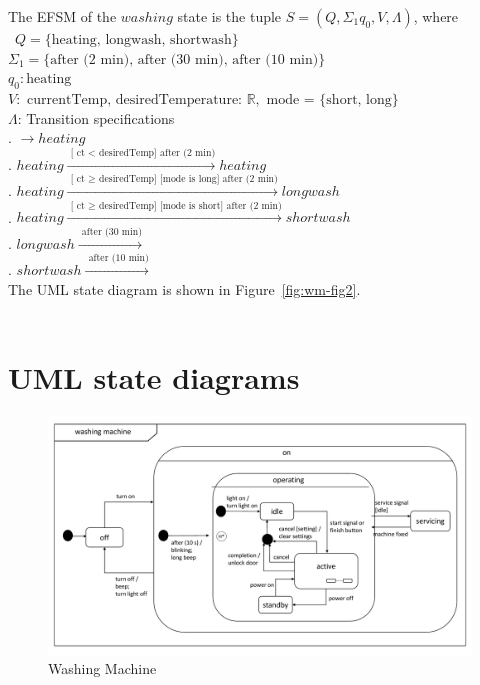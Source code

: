 \documentclass[12pt]{article}
\begin{document}
\begin{spacing}{1.5}
\noindent The EFSM of the $washing$ state is the tuple $S = (Q, \Sigma_1 q_0, V, \Lambda)$, where\\\
\noindent $Q = \{\text {heating, longwash, shortwash}\}$\\
\noindent $\Sigma_1 = \{\text {after (2 min), after (30 min), after (10 min)}\}$\\ 
\noindent $q_0: \text{heating}$\\
\noindent $V: \text{ currentTemp, desiredTemperature: } \mathbb{R}, \text{ mode = \{short, long\}}$\\
\noindent $\Lambda$: Transition specifications\\
. $\xrightarrow {} heating$\\
. $heating \xrightarrow {\text { [ ct $<$ desiredTemp] after (2 min)}} heating $\\
\indent 3. $heating \xrightarrow {\text { [ ct $\geq$ desiredTemp] [mode is long] after (2 min)}}  longwash$\\
\indent 4. $heating \xrightarrow {\text { [ ct $\geq$ desiredTemp] [mode is short] after (2 min)}}  shortwash$\\
. $longwash  \xrightarrow {\text { after (30 min)}}$\\
\indent 5. $shortwash  \xrightarrow {\text { after (10 min)}}$\\

\noindent The UML state diagram is shown in Figure~\ref{fig:wm-fig2}.\\\\
\newpage

\section{UML state diagrams}

\begin{figure}[h!]
	\centering
		\includegraphics[page=1,width=1\textwidth]{./figures/updatedSecondDraft.pdf}
		  \caption{Washing Machine}
  \label{fig:wm-fig1}
\end{figure}


\end{spacing}
\end{document}
